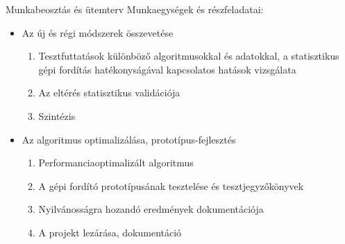 \begin{frame}{Munkabeosztás és ütemterv}
Munkaegységek és részfeladatai:
\begin{itemize}
  \item<1-> {
    Az új és régi módszerek összevetése
    \begin{enumerate}
        \item Tesztfuttatások különböző algoritmusokkal és adatokkal, a statisztikus gépi fordítás hatékonyságával kapcsolatos hatások vizsgálata
        \item Az eltérés statisztikus validációja
        \item Szintézis
    \end{enumerate}
  }
  \item<2-> {
    Az algoritmus optimalizálása, prototípus-fejlesztés
    \begin{enumerate}
        \item Performanciaoptimalizált algoritmus
        \item A gépi fordító prototípusának tesztelése és tesztjegyzőkönyvek
        \item Nyilvánosságra hozandó eredmények dokumentációja
        \item A projekt lezárása, dokumentáció
    \end{enumerate}
  }
  \end{itemize}
\end{frame}

    

